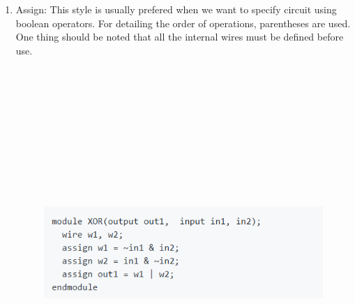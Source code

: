 \documentclass[11pt]{article}
\begin{document}
\begin{enumerate}
\item Assign: 
This style is usually prefered when we want to specify circuit using boolean operators. For detailing the order of operations, parentheses are used. One thing should be noted that all the internal wires must be defined before use.\bigskip
\begin{figure}[ht!]
\centering
\includegraphics[width=11cm,height=14cm,keepaspectratio]{Screenshot_3.png}
\label{Assign exmaple}
\end{figure}


\end{enumerate}
\end{document}
